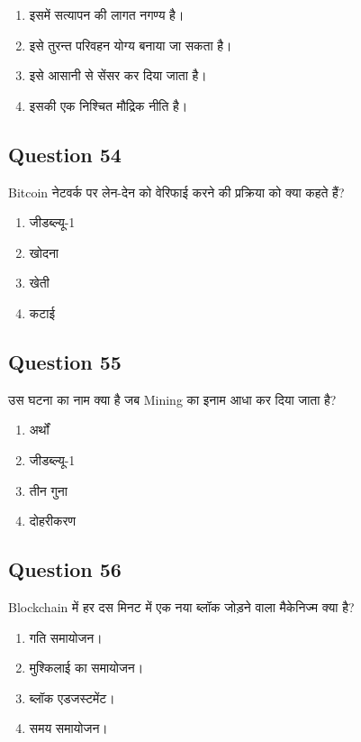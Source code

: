 \documentclass[12pt,a4paper]{article}
\begin{document}
\begin{enumerate}[label=\Alph*., leftmargin=*]
\item इसमें सत्यापन की लागत नगण्य है।
\item इसे तुरन्त परिवहन योग्य बनाया जा सकता है।
\item इसे आसानी से सेंसर कर दिया जाता है।
\item इसकी एक निश्चित मौद्रिक नीति है।
\end{enumerate}

\bigskip


\subsection*{Question 54}
Bitcoin नेटवर्क पर लेन-देन को वेरिफाई करने की प्रक्रिया को क्या कहते हैं?

\begin{enumerate}[label=\Alph*., leftmargin=*]
\item जीडब्ल्यू-1
\item खोदना
\item खेती
\item कटाई
\end{enumerate}

\bigskip


\subsection*{Question 55}
उस घटना का नाम क्या है जब Mining का इनाम आधा कर दिया जाता है?

\begin{enumerate}[label=\Alph*., leftmargin=*]
\item अर्थों
\item जीडब्ल्यू-1
\item तीन गुना
\item दोहरीकरण
\end{enumerate}

\bigskip


\subsection*{Question 56}
Blockchain में हर दस मिनट में एक नया ब्लॉक जोड़ने वाला मैकेनिज्म क्या है?

\begin{enumerate}[label=\Alph*., leftmargin=*]
\item गति समायोजन।
\item मुश्किलाई का समायोजन।
\item ब्लॉक एडजस्टमेंट।
\item समय समायोजन।
\end{enumerate}
\end{document}
